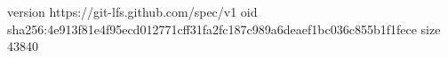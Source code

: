 version https://git-lfs.github.com/spec/v1
oid sha256:4e913f81e4f95ecd012771cff31fa2fc187c989a6deaef1bc036c855b1f1fece
size 43840
